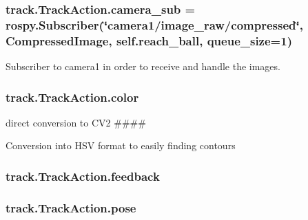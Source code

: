 \subsubsection[{\texorpdfstring{camera\+\_\+sub}{camera_sub}}]{\setlength{\rightskip}{0pt plus 5cm}track.\+Track\+Action.\+camera\+\_\+sub = rospy.\+Subscriber(\char`\"{}camera1/image\+\_\+raw/compressed\char`\"{}, Compressed\+Image, self.\+reach\+\_\+ball, {\bf queue\+\_\+size}=1)\hspace{0.3cm}{\ttfamily [static]}}\hypertarget{classtrack_1_1TrackAction_a71b1a13ec7fb0ba79d6f34416b7d54e1}{}\label{classtrack_1_1TrackAction_a71b1a13ec7fb0ba79d6f34416b7d54e1}


Subscriber to camera1 in order to receive and handle the images. 

\subsubsection[{\texorpdfstring{color}{color}}]{\setlength{\rightskip}{0pt plus 5cm}track.\+Track\+Action.\+color}\hypertarget{classtrack_1_1TrackAction_abba894c7d22403050003dc50f5d79bba}{}\label{classtrack_1_1TrackAction_abba894c7d22403050003dc50f5d79bba}


direct conversion to C\+V2 \#\#\#\# 

Conversion into H\+SV format to easily finding contours 
\subsubsection[{\texorpdfstring{feedback}{feedback}}]{\setlength{\rightskip}{0pt plus 5cm}track.\+Track\+Action.\+feedback\hspace{0.3cm}{\ttfamily [static]}}\hypertarget{classtrack_1_1TrackAction_acce0064c9d83a91f00d92a854014cdf5}{}\label{classtrack_1_1TrackAction_acce0064c9d83a91f00d92a854014cdf5}
\subsubsection[{\texorpdfstring{pose}{pose}}]{\setlength{\rightskip}{0pt plus 5cm}track.\+Track\+Action.\+pose\hspace{0.3cm}{\ttfamily [static]}}\hypertarget{classtrack_1_1TrackAction_a25be61bbb562612dc1e1c5e7c448fa4c}{}\label{classtrack_1_1TrackAction_a25be61bbb562612dc1e1c5e7c448fa4c}


